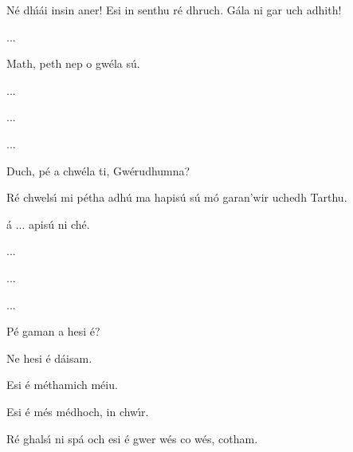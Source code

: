 \begin{rightbubbles}N\'{e} dh\'{\i}\'{a}i insin aner! Esi in senthu r\'{e} dhruch. G\'{a}la ni gar uch adhith!\end{rightbubbles}
\begin{rightbubbles}...\end{rightbubbles}
\begin{leftbubbles}Math, peth nep o gw\'{e}la s\'{u}.\end{leftbubbles}
\begin{rightbubbles}...\end{rightbubbles}
\begin{rightbubbles}...\end{rightbubbles}
\begin{rightbubbles}...\end{rightbubbles}
\begin{rightbubbles}Duch, p\'{e} a chw\'{e}la ti, Gw\'{e}rudhumna?\end{rightbubbles}
\begin{leftbubbles}R\'{e} chwels\'{\i} mi p\'{e}tha adh\'{u} ma hapis\'{u} s\'{u} m\'{o} garan’wir uchedh Tarthu.\end{leftbubbles}
\begin{rightbubbles}\'{a} ... apis\'{u} ni ch\'{e}.\end{rightbubbles}
\begin{rightbubbles}...\end{rightbubbles}
\begin{rightbubbles}...\end{rightbubbles}
\begin{rightbubbles}...\end{rightbubbles}
\begin{leftbubbles}P\'{e} gaman a hesi \'{e}?\end{leftbubbles}
\begin{rightbubbles}Ne hesi \'{e} d\'{a}isam.\end{rightbubbles}
\begin{rightbubbles}Esi \'{e} m\'{e}thamich m\'{e}iu.\end{rightbubbles}
\begin{rightbubbles}Esi \'{e} m\'{e}s m\'{e}dhoch, in chw\'{\i}r.\end{rightbubbles}
\begin{rightbubbles}R\'{e} ghals\'{\i} ni sp\'{a} och esi \'{e} gwer w\'{e}s co w\'{e}s, cotham.\end{rightbubbles}
